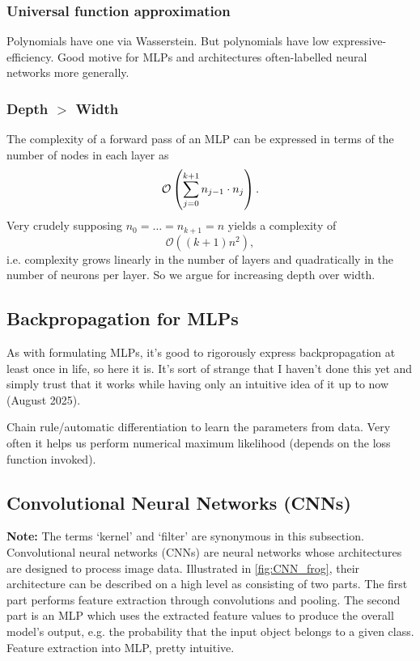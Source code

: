 \documentclass[11pt]{article}
\begin{document}
\subsubsection{Universal function approximation}
\label{subsubsec:universal_function_approximation_theorem}
Polynomials have one via Wasserstein. But polynomials have low expressive-efficiency. Good motive for MLPs and architectures often-labelled neural networks more generally.

\subsubsection{Depth $>$ Width}
\label{subsubsec:deep_MLPs}
The complexity of a forward pass of an MLP can be expressed in terms of the number of nodes in each layer as
$$
\mathcal{O}
\left(
\sum_{j=0}^{k+1}n_{j-1}\cdot n_j
\right).
$$
Very crudely supposing $n_0=\dots=n_{k+1}=n$ yields a complexity of
$$
\mathcal{O}((k+1)n^2),
$$
i.e. complexity grows linearly in the number of layers and quadratically in the number of neurons per layer. So we argue for increasing depth over width.

\subsection{Backpropagation for MLPs}
\label{subsec:backprop}
As with formulating MLPs, it's good to rigorously express backpropagation at least once in life, so here it is. It's sort of strange that I haven't done this yet and simply trust that it works while having only an intuitive idea of it up to now (August 2025).

Chain rule/automatic differentiation to learn the parameters from data. Very often it helps us perform numerical maximum likelihood (depends on the loss function invoked).

\subsection{Convolutional Neural Networks (CNNs)}
\label{subsec:conv_neural_networks}

\textbf{Note:} The terms `kernel' and `filter' are synonymous in this subsection.\\

\noindent Convolutional neural networks (CNNs) are neural networks whose architectures are designed to process image data. Illustrated in \autoref{fig:CNN_frog}, their architecture can be described on a high level as consisting of two parts. The first part performs feature extraction through convolutions and pooling. The second part is an MLP which uses the extracted feature values to produce the overall model's output, e.g. the probability that the input object belongs to a given class. Feature extraction into MLP, pretty intuitive.
\end{document}

